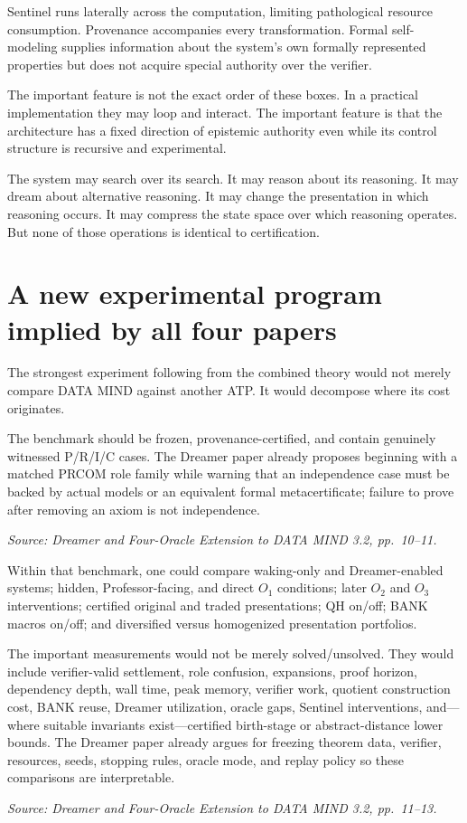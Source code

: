 \documentclass[11pt]{article}
\newcommand{\src}[1]{\par\smallskip\noindent\textit{Source: #1}\normalsize}
\begin{document}
Sentinel runs laterally across the computation, limiting pathological resource consumption. Provenance accompanies every transformation. Formal self-modeling supplies information about the system's own formally represented properties but does not acquire special authority over the verifier.

The important feature is not the exact order of these boxes. In a practical implementation they may loop and interact. The important feature is that the architecture has a fixed direction of epistemic authority even while its control structure is recursive and experimental.

The system may search over its search. It may reason about its reasoning. It may dream about alternative reasoning. It may change the presentation in which reasoning occurs. It may compress the state space over which reasoning operates. But none of those operations is identical to certification.

\section{A new experimental program implied by all four papers}

The strongest experiment following from the combined theory would not merely compare DATA MIND against another ATP. It would decompose where its cost originates.

The benchmark should be frozen, provenance-certified, and contain genuinely witnessed P/R/I/C cases. The Dreamer paper already proposes beginning with a matched PRCOM role family while warning that an independence case must be backed by actual models or an equivalent formal metacertificate; failure to prove after removing an axiom is not independence.
\src{\emph{Dreamer and Four-Oracle Extension to DATA MIND 3.2}, pp.~10--11.}

Within that benchmark, one could compare waking-only and Dreamer-enabled systems; hidden, Professor-facing, and direct $O_1$ conditions; later $O_2$ and $O_3$ interventions; certified original and traded presentations; QH on/off; BANK macros on/off; and diversified versus homogenized presentation portfolios.

The important measurements would not be merely solved/unsolved. They would include verifier-valid settlement, role confusion, expansions, proof horizon, dependency depth, wall time, peak memory, verifier work, quotient construction cost, BANK reuse, Dreamer utilization, oracle gaps, Sentinel interventions, and---where suitable invariants exist---certified birth-stage or abstract-distance lower bounds. The Dreamer paper already argues for freezing theorem data, verifier, resources, seeds, stopping rules, oracle mode, and replay policy so these comparisons are interpretable.
\src{\emph{Dreamer and Four-Oracle Extension to DATA MIND 3.2}, pp.~11--13.}
\end{document}
